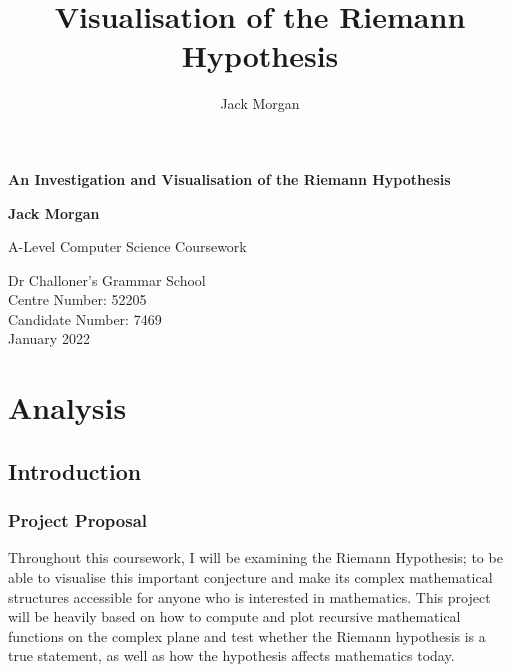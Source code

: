 \documentclass{article}
\author{Jack Morgan}
\title{Visualisation of the Riemann Hypothesis}
\begin{document}
\begin{titlepage}
    \begin{center}
    \vspace*{1cm}

    \Huge
    \textbf{An Investigation and Visualisation of the Riemann Hypothesis}

    \vspace{0.5cm}
    \LARGE
    \vspace{1.5cm}

    \textbf{Jack Morgan}

    \vfill

    A-Level Computer Science Coursework\\

    \vspace{2cm}

    \Large
    Dr Challoner's Grammar School\\
    Centre Number: 52205\\
    Candidate Number: 7469\\
    January 2022\\

    \vspace{1cm}

    \end{center}
\end{titlepage}

\tableofcontents

\clearpage

\section{Analysis}

\subsection{Introduction}

\subsubsection{Project Proposal}

Throughout this coursework, I will be examining the Riemann Hypothesis; to be able to visualise this important conjecture and make its complex mathematical structures accessible for anyone who is interested in mathematics. This project will be heavily based on how to compute and plot recursive mathematical functions on the complex plane and test whether the Riemann hypothesis is a true statement, as well as how the hypothesis affects mathematics today.
\end{document}
